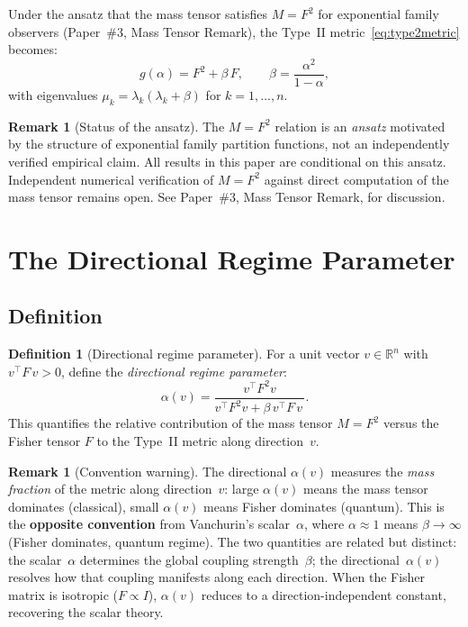 \documentclass[11pt,a4paper]{article}
\theoremstyle{plain}
\theoremstyle{definition}
\newtheorem{definition}[theorem]{Definition}
\newtheorem{remark}[theorem]{Remark}
\newcommand{\R}{\mathbb{R}}
\begin{document}
Under the ansatz that the mass tensor satisfies $M = F^2$ for
exponential family observers (Paper~\#3, Mass Tensor Remark), the Type~II
metric~\eqref{eq:type2metric} becomes:
\begin{equation}
\label{eq:gmetric}
g(\alpha) = F^2 + \beta\, F, \qquad
\beta = \frac{\alpha^2}{1 - \alpha},
\end{equation}
with eigenvalues $\mu_k = \lambda_k(\lambda_k + \beta)$ for
$k = 1, \ldots, n$.

\begin{remark}[Status of the ansatz]
\label{rem:ansatz}
The $M = F^2$ relation is an \emph{ansatz} motivated by the
structure of exponential family partition functions, not an
independently verified empirical claim.  All results in this
paper are conditional on this ansatz.  Independent numerical
verification of $M = F^2$ against direct computation of the
mass tensor remains open.  See Paper~\#3,
Mass Tensor Remark, for discussion.
\end{remark}


\section{The Directional Regime Parameter}
\label{sec:directional}

\subsection{Definition}

\begin{definition}[Directional regime parameter]
\label{def:alpha_v}
For a unit vector $v \in \R^n$ with $v^\top F\, v > 0$, define the
\emph{directional regime parameter}:
\begin{equation}
\label{eq:alpha_v}
\alpha(v) = \frac{v^\top F^2 v}{v^\top F^2 v + \beta\, v^\top F\, v\,}.
\end{equation}
This quantifies the relative contribution of the mass tensor
$M = F^2$ versus the Fisher tensor $F$ to the Type~II metric
along direction~$v$.
\end{definition}

\begin{remark}[Convention warning]
\label{rem:convention}
The directional $\alpha(v)$ measures the \emph{mass fraction} of
the metric along direction~$v$: large $\alpha(v)$ means the mass
tensor dominates (classical), small $\alpha(v)$ means Fisher
dominates (quantum).  This is the \textbf{opposite convention} from
Vanchurin's scalar~$\alpha$, where $\alpha \approx 1$ means
$\beta \to \infty$ (Fisher dominates, quantum regime).  The two
quantities are related but distinct: the scalar~$\alpha$ determines
the global coupling strength~$\beta$; the directional~$\alpha(v)$
resolves how that coupling manifests along each direction.
When the Fisher matrix is isotropic ($F \propto I$), $\alpha(v)$
reduces to a direction-independent constant, recovering the scalar theory.
\end{remark}
\end{document}
